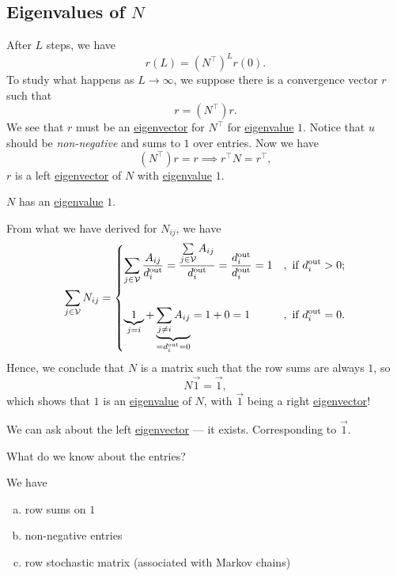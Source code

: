\subsection{Eigenvalues of \(N\)}
After \(L\) steps, we have
\[
	r(L) = (N^{\top})^L r(0).
\]
To study what happens as \(L\to \infty\), we suppose there is a convergence vector \(r\) such that
\[
	r = (N^{\top})r.
\]
We see that \(r\) must be an \hyperref[def:eigenvector]{eigenvector} for \(N^{\top}\) for \hyperref[def:eigenvalue]{eigenvalue} \(1\). Notice that \(u\) should be
\emph{non-negative} and sums to \(1\) over entries. Now we have
\[
	(N^{\top})r = r \implies r^{\top}N = r^{\top},
\]
\(r\) is a left \hyperref[def:eigenvector]{eigenvector} of \(N\) with \hyperref[def:eigenvalue]{eigenvalue} \(1\).
\begin{note}
	\(N\) has an \hyperref[def:eigenvalue]{eigenvalue} \(1\).
\end{note}
\begin{explanation}
	From what we have derived for \(N_{ij} \), we have
	\[
		\sum\limits_{j\in\mathcal{V}}N_{ij} = \begin{dcases}
			\sum\limits_{j\in\mathcal{V}} \frac{A_{ij}}{d_{i}^{\text{out}}} = \frac{\sum\limits_{j\in\mathcal{V}} A_{ij} }{d_{i}^{\text{out}}} = \frac{d_{i}^{\text{out}}}{d_{i}^{\text{out}}}= 1 & , \text{ if }d_{i}^{\text{out}} > 0; \\\\
			\underbrace{1}_{j = i} + \underbrace{\sum\limits_{j\neq i} A_{ij}}_{ = d_{i}^{\text{out}} = 0} = 1 + 0 = 1                                                                            & , \text{ if }d_{i}^{\text{out}} = 0. \\
		\end{dcases}
	\]
	Hence, we conclude that \(N\) is a matrix such that the row sums are always \(1\), so
	\[
		N \vec{1} = \vec{1},
	\]
	which shows that \(1\) is an \hyperref[def:eigenvalue]{eigenvalue} of \(N\), with \(\vec{1}\) being a right \hyperref[def:eigenvector]{eigenvector}!
\end{explanation}

We can ask about the left \hyperref[def:eigenvector]{eigenvector} — it exists. Corresponding to \(\vec{1}\).
\begin{problem}
What do we know about the entries?
\end{problem}
\begin{answer}
	We have
	\begin{enumerate}[(a)]
		\item row sums on \(1\)
		\item non-negative entries
		\item row stochastic matrix (associated with Markov chains)
	\end{enumerate}
\end{answer}


